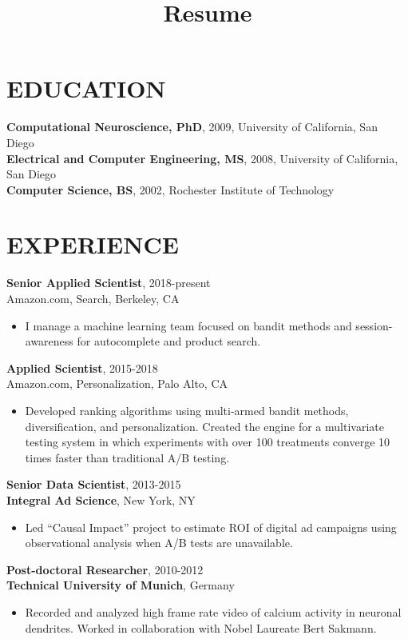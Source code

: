 \documentclass[line,10pt]{res}
\title{Resume}
\begin{document}
 
\thispagestyle{empty} %
\address{716.771.8224}
\address{daniel.n.hill@gmail.com}

\begin{resume}

\section{EDUCATION}
 \textbf{Computational Neuroscience, PhD}, 2009, University of California, San Diego \\
 \textbf{Electrical and Computer Engineering, MS}, 2008, University of California, San Diego \\
 \textbf{Computer Science, BS}, 2002, Rochester Institute of Technology
\section{EXPERIENCE}
 {\bf Senior Applied Scientist}, 2018-present \\ Amazon.com, Search, Berkeley, CA 
  \begin{itemize}
          \item[] I manage a machine learning team focused on bandit methods and session-awareness for autocomplete and product search.
   \end{itemize}

 {\bf Applied Scientist}, 2015-2018 \\ Amazon.com, Personalization, Palo Alto, CA 
  \begin{itemize}
          \item[] Developed ranking algorithms using multi-armed bandit methods, diversification, and personalization. Created the engine for a multivariate testing system in which experiments with over 100 treatments converge 10 times faster than traditional A/B testing.  
   \end{itemize}
   
 {\bf Senior Data Scientist}, 2013-2015 \\ {\bf Integral Ad Science}, New York, NY 
  \begin{itemize}
          \item[] {\small Led ``Causal Impact'' project to estimate ROI of digital ad campaigns using observational analysis when A/B tests are unavailable.  }
        \end{itemize}
{\bf Post-doctoral Researcher}, 2010-2012 \\ {\bf Technical University of Munich}, Germany 
  \begin{itemize}
        \item[] {\small 
Recorded and analyzed high frame rate video of calcium activity in neuronal dendrites.  Worked in collaboration with Nobel Laureate Bert Sakmann.        }
  \end{itemize}


\end{resume}
\end{document}
